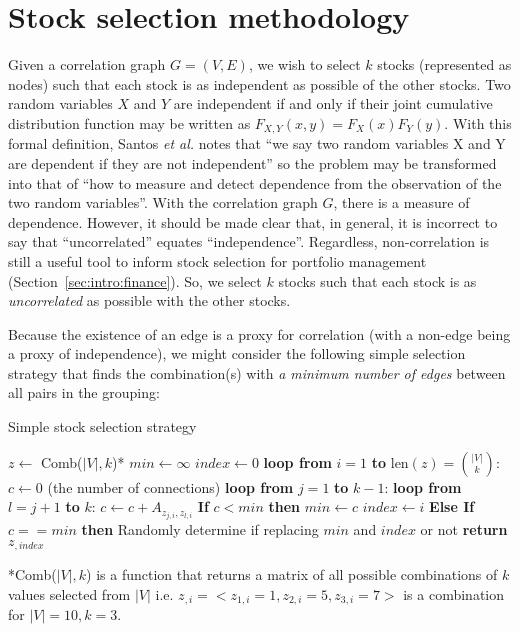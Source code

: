\section{Stock selection methodology}
\label{sec:usage:stockselection}

Given a correlation graph $G=(V,E)$, we wish to select $k$ stocks (represented 
as nodes) such that each stock is as independent as possible of the other 
stocks. Two random variables $X$ and $Y$ are independent if and only if their 
joint cumulative distribution function may be written as 
$F_{X,Y}(x,y)=F_X(x)F_Y(y)$. With this formal definition, Santos \textit{et 
al.} notes that ``we say two random variables X and Y are dependent if they
are not independent'' so the problem may be transformed into that of ``how to 
measure and detect dependence from the observation of the two random 
variables''\cite{santos2013}. With the correlation graph $G$, there is
a measure of dependence. However, it should be made clear that, in general, 
it is incorrect to say that ``uncorrelated'' equates ``independence''. 
Regardless, non-correlation is still a useful tool to inform stock selection 
for portfolio management (Section~\ref{sec:intro:finance}). So, we select $k$ 
stocks such that each stock is as \textit{uncorrelated} as possible with the 
other stocks.

Because the existence of an edge is a proxy for correlation (with a non-edge 
being a proxy of independence), we might consider the following simple 
selection strategy that finds the combination(s) with \textit{a minimum number 
of edges} between all pairs in the grouping:

\tablespacing
\begin{algorithm}[H]
	\caption{Simple stock selection strategy}\label{alg:usage:stockselection1}
	\begin{algorithmic}[1]
		\State $z \gets$ Comb($|V|,k$)*
		\State $min \gets \infty$
		\State $index \gets 0$
		\State \textbf{loop from} $i=1$ \textbf{to} $\text{len}(z) = 
		{|V| \choose k}$:
		\State \indent $c \gets 0$ (the number of connections)
		\State \indent \textbf{loop from} $j = 1$ \textbf{to} $k-1$:
		\State \indent \indent \textbf{loop from} $l=j+1$ \textbf{to} $k$:
		\State \indent \indent \indent $c \gets c+A_{z_{j,i},z_{l,i}}$
		\State \indent \textbf{If} $c < min$ \textbf{then}
		\State \indent \indent $min \gets c$
		\State \indent \indent $index \gets i$
		\State \indent \textbf{Else If} $c == min$ \textbf{then}
		\State \indent \indent Randomly determine if replacing $min$ and 
		$index$ or not
		\State \textbf{return} $z_{,index}$
		\EndProcedure
	\end{algorithmic}
	*Comb($|V|,k$) is a function that returns a matrix of all possible 
	combinations of $k$ values selected from $|V|$ i.e. $z_{,i}=<z_{1,i} = 1, 
	z_{2,i} = 5, z_{3,i} = 7>$ is a combination for $|V|=10,k=3$.
\end{algorithm}
\bodyspacing

